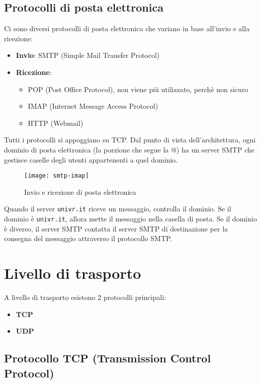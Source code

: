 \documentclass[a4paper]{article}
\begin{document}
\subsection{Protocolli di posta elettronica}
Ci sono diversi protocolli di posta elettronica che variano in base all'invio e alla 
ricezione:
\begin{itemize}
  \item \textbf{Invio}: SMTP (Simple Mail Transfer Protocol)
  \item \textbf{Ricezione}:
    \begin{itemize}
      \item POP (Post Office Protocol), non viene più utilizzato, perchè non sicuro
      \item IMAP (Internet Message Access Protocol)
      \item HTTP (Webmail)
    \end{itemize}
\end{itemize}
Tutti i protocolli si appoggiano su TCP. Dal punto di vista dell'architettura, ogni
dominio di posta elettronica (la porzione che segue la @) ha un server SMTP che gestisce 
caselle degli utenti appartenenti a quel dominio.
\begin{figure}[H]
  \centering
  \texttt{[image: smtp-imap]}
  \caption{Invio e ricezione di posta elettronica}
\end{figure}
\noindent
Quando il server \texttt{univr.it} riceve un messaggio, controlla il dominio. Se il
dominio è \texttt{univr.it}, allora mette il messaggio nella casella di posta.
Se il dominio è diverso, il server SMTP contatta il server SMTP di destinazione per
la consegna del messaggio attraverso il protocollo SMTP.

\section{Livello di trasporto}
A livello di trasporto esistono 2 protocolli principali:
\begin{itemize}
  \item \textbf{TCP}
  \item \textbf{UDP}
\end{itemize}

\subsection{Protocollo TCP (Transmission Control Protocol)}
\end{document}

